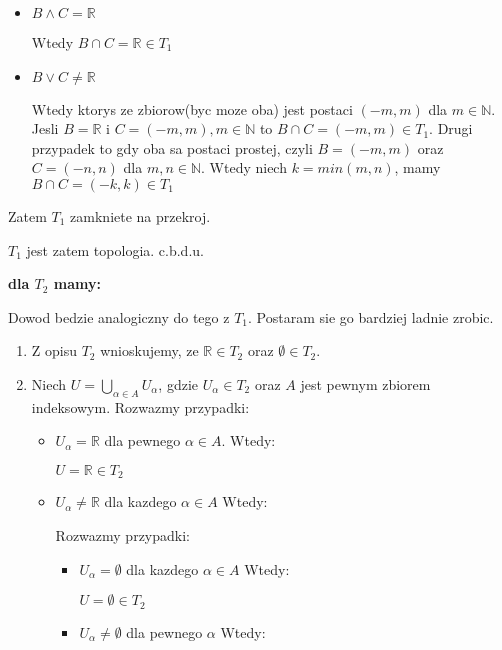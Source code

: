 \documentclass{article}
\begin{document}
\begin{enumerate}
\begin{enumerate}[label=(\alph*')]
\begin{itemize}
\begin{itemize}

\item $B \land C = \mathbb{R}$ 

Wtedy $B \cap C = \mathbb{R} \in T_{1}$

\item $B \lor C \neq \mathbb{R}$ 

Wtedy ktorys ze zbiorow(byc moze oba) jest postaci $(-m,m)$ dla $m \in \mathbb{N}$. Jesli $B = \mathbb{R}$ i $C = (-m,m), m\in \mathbb{N}$ to $B \cap C = (-m,m) \in T_{1}$.
Drugi przypadek to gdy oba sa postaci prostej, czyli $B = (-m,m)$ oraz $C = (-n,n)$ dla $m,n \in \mathbb{N}$. Wtedy niech $k = min(m,n)$, mamy $B \cap C = (-k,k) \in T_{1}$

\end{itemize}
\end{itemize}
Zatem $T_{1}$ zamkniete na przekroj.    
\end{enumerate}
$T_{1}$ jest zatem topologia. c.b.d.u.

\textbf{dla $T_{2}$ mamy:} 

Dowod bedzie analogiczny do tego z $T_{1}$. Postaram sie go bardziej ladnie zrobic.

\begin{enumerate}[label=(\alph*')]%

\item Z opisu $T_{2}$ wnioskujemy, ze $\mathbb{R} \in T_{2}$ oraz $\emptyset \in T_{2}$.
\item Niech $U = \bigcup\limits_{\alpha \in A}U_{\alpha}$, gdzie $U_{\alpha} \in T_{2}$ oraz $A$ jest pewnym zbiorem indeksowym. Rozwazmy przypadki:

\begin{itemize}%
   
\item $U_{\alpha} = \mathbb{R}$ dla pewnego $\alpha \in A$. Wtedy:

$U = \mathbb{R} \in T_{2}$
\item $U_{\alpha} \neq \mathbb{R}$ dla kazdego $\alpha \in A$ Wtedy:

Rozwazmy przypadki:
\begin{itemize}%

\item $U_{\alpha} = \emptyset$ dla kazdego $\alpha \in A$ Wtedy:

$U = \emptyset \in T_{2}$
\item $U_{\alpha} \neq \emptyset$ dla pewnego $\alpha$ Wtedy:


\end{itemize}
\end{itemize}
\end{enumerate}
\end{enumerate}
\end{document}

